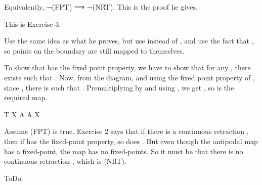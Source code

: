 		  Equivalently, ¬(FPT) ⟹ ¬(NRT). This is the proof he gives.

		  This is Exercise 3.


	\stopsection

	\startsection [title={Session 10, Exercise 1}]
		Use the same idea as what he proves, but use  instead of , and use the fact that , so points on the boundary are still mapped to themselves.
	\stopsection

	\startsection [title={Session 10, Exercise 2}]
		To show that  has the fixed point property, we have to show that for any , there exists  such that . Now, from the diagram, and using the fixed point property of , since , there is  such that . Premultiplying by  and using , we get , so  is the required map.

		\starttikzcd
			T
				\arrow[r, "x", orange]
			\NC  X
				\arrow[r, "r", red]
			\NC  A
				\arrow[r, "g"]
			\NC  A
				\arrow[r, "s", blue]
			\NC  X
			\NR
		\stoptikzcd
	\stopsection

	\startsection [title={Session 10, Exercise 3}]
		Assume (FPT) is true. Exercise 2 says that if there is a continuous retraction , then if  has the fixed-point property, so does . But even though the antipodal map  has a fixed-point, the map  has no fixed-points. So it must be that there is no continuous retraction , which is (NRT).
	\stopsection

	\startsection [title={Session 10, Exercise 4}]
		ToDo.
	\stopsection

